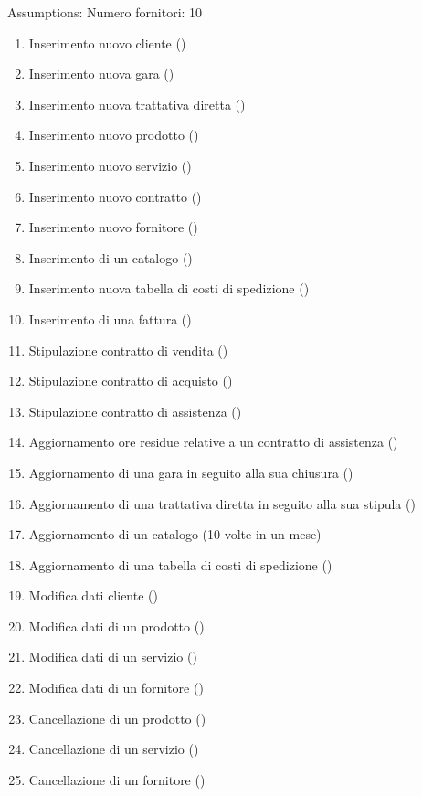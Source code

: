 

Assumptions: Numero fornitori: 10

\begin{enumerate}

  \item Inserimento nuovo cliente ()
  \item Inserimento nuova gara ()
  \item Inserimento nuova trattativa diretta ()
  \item Inserimento nuovo prodotto ()
  \item Inserimento nuovo servizio ()
  \item Inserimento nuovo contratto ()
  \item Inserimento nuovo fornitore ()
  \item Inserimento di un catalogo ()
  \item Inserimento nuova tabella di costi di spedizione ()
  \item Inserimento di una fattura ()
  \item Stipulazione contratto di vendita ()
  \item Stipulazione contratto di acquisto ()
  \item Stipulazione contratto di assistenza ()
  \item Aggiornamento ore residue relative a un contratto di assistenza ()
  \item Aggiornamento di una gara in seguito alla sua chiusura ()
  \item Aggiornamento di una trattativa diretta in seguito alla sua stipula ()
  \item Aggiornamento di un catalogo (10 volte in un mese)
  \item Aggiornamento di una tabella di costi di spedizione ()
  \item Modifica dati cliente ()
  \item Modifica dati di un prodotto ()
  \item Modifica dati di un servizio ()
  \item Modifica dati di un fornitore ()
  \item Cancellazione di un prodotto ()
  \item Cancellazione di un servizio ()
  \item Cancellazione di un fornitore ()

\end{enumerate}
